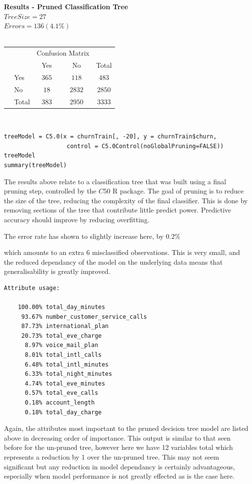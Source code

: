 \documentclass[paper=a4, fontsize=11pt]{scrartcl} %
\begin{document}
{\bf Results - Pruned Classification Tree}\\
$Tree Size = 27$ \\
$Errors = 136 (4.1\%)$\\\\
\begin{tabular}{l|l|c|c|c}
\multicolumn{2}{c}{}&\multicolumn{2}{c}{Confusion Matrix}&\\
\cline{3-4}
\multicolumn{2}{c|}{}&Yes&No&\multicolumn{1}{c}{Total}\\
\cline{2-4}
\multirow{2}{*}{}& Yes & $365$ & $118$ & $483$\\
\cline{2-4}
& No & $18$ & $2832$ & $2850$\\
\cline{2-4}
\multicolumn{1}{c}{} & \multicolumn{1}{c}{Total} & \multicolumn{1}{c}{$383$} & \multicolumn{    1}{c}{$2950$} & \multicolumn{1}{c}{$3333$}\\
\end{tabular}\\
\begin{lstlisting}
treeModel = C5.0(x = churnTrain[, -20], y = churnTrain$churn,
                  control = C5.0Control(noGlobalPruning=FALSE))
treeModel
summary(treeModel)
\end{lstlisting}
{\par The results above relate to a classification tree that was built using a final pruning step, controlled by the $C50$ R package. The goal of pruning is to reduce the size of the tree, reducing the complexity of the final classifier. This is done by removing sections of the tree that contribute little predict power. Predictive accuracy should improve by reducing overfitting. {\par The error rate has shown to slightly increase here, by $0.2\%$} which amounts to an extra 6 misclassified observations. This is very small, and the reduced dependancy of the model on the underlying data means that generalisability is greatly improved.  
\small{
\begin{verbatim}
Attribute usage:

	100.00%	total_day_minutes
	 93.67%	number_customer_service_calls
	 87.73%	international_plan
	 20.73%	total_eve_charge
	  8.97%	voice_mail_plan
	  8.01%	total_intl_calls
	  6.48%	total_intl_minutes
	  6.33%	total_night_minutes
	  4.74%	total_eve_minutes
	  0.57%	total_eve_calls
	  0.18%	account_length
	  0.18%	total_day_charge

\end{verbatim}}
Again, the attributes most important to the pruned decision tree model are listed above in decreasing order of importance. This output is similar to that seen before for the un-pruned tree, however here we have 12 variables total which represents a reduction by 1 over the un-pruned tree. This may not seem significant but any reduction in model dependancy is certainly advantageous, especially when model performance is not greatly effected as is the case here. }\\\\
\end{document}
